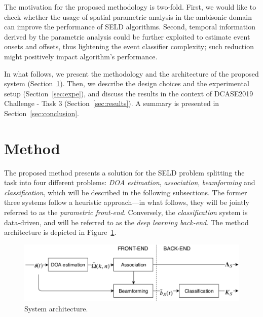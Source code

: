 The motivation for the proposed methodology is two-fold.
First, we would like to check whether the usage of spatial parametric analysis in the ambisonic domain can improve the performance of SELD algorithms.
Second, temporal information derived by the parametric analysis could be further exploited to estimate event onsets and offsets, thus lightening the event classifier complexity; such reduction might positively impact algorithm's performance.

In what follows, we present the methodology and the architecture of the proposed system (Section~\ref{sec:method}). Then, we describe the design choices and the experimental setup (Section~\ref{sec:expe}), and discuss the results in the context of DCASE2019 Challenge - Task 3 (Section~\ref{sec:results}). A summary is presented in Section~\ref{sec:conclusion}. 


\section{Method}
\label{sec:method}

The proposed method presents a solution for the SELD problem splitting the task into four different problems: \textit{DOA  estimation}, \textit{association}, \textit{beamforming} and \textit{classification}, which will be described in the following subsections.
The former three systems follow a heuristic approach---in what follows, they will be jointly referred to as the \textit{parametric front-end}. Conversely, the \textit{classification} system is data-driven, and will be referred to as the \textit{deep learning back-end}. The method architecture is depicted in Figure~\ref{fig:diagram_all}.


\begin{figure}[h]
	\centering
    \includegraphics[width=\columnwidth]{Figures//SELD/dcase_challenge_tech_report_all2.pdf}
    \caption{System architecture.}
    \label{fig:diagram_all}

\end{figure}

